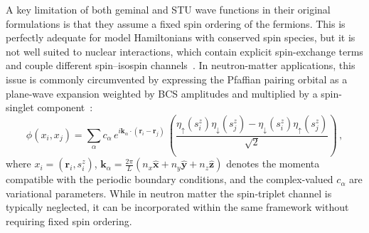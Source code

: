 A key limitation of both geminal and STU wave functions in their original formulations is that they assume a fixed spin ordering of the fermions. This is perfectly adequate for model Hamiltonians with conserved spin species, but it is not well suited to nuclear interactions, which contain explicit spin-exchange terms and couple different spin–isospin channels~\cite{piarulli_local_2020}. In neutron-matter applications, this issue is commonly circumvented by expressing the Pfaffian pairing orbital as a plane-wave expansion weighted by BCS amplitudes and multiplied by a spin-singlet component~\cite{Gandolfi2009}:
\begin{equation}
\phi(x_i, x_j)
= \sum_{\alpha} c_{\alpha} \,
e^{i \mathbf{k}_{\alpha} \cdot (\mathbf{r}_i - \mathbf{r}_j)}\,\left(
\frac{\eta_\uparrow(s_i^z)\eta_\downarrow(s_j^z)
      - \eta_\downarrow(s_i^z)\eta_\uparrow(s_j^z)}{\sqrt{2}}\right) \, ,
\label{eq:pf_pairing_orbital_nm}
\end{equation}
where $x_i = (\mathbf{r}_i, s_i^z)$,
$\mathbf{k}_{\alpha} = \tfrac{2\pi}{L}(n_x \hat{\mathbf{x}} + n_y \hat{\mathbf{y}} + n_z \hat{\mathbf{z}})$
denotes the momenta compatible with the periodic boundary conditions, and the complex-valued $c_{\alpha}$ are variational parameters. While in neutron matter the spin-triplet channel is typically neglected, it can be incorporated within the same framework without requiring fixed spin ordering.

